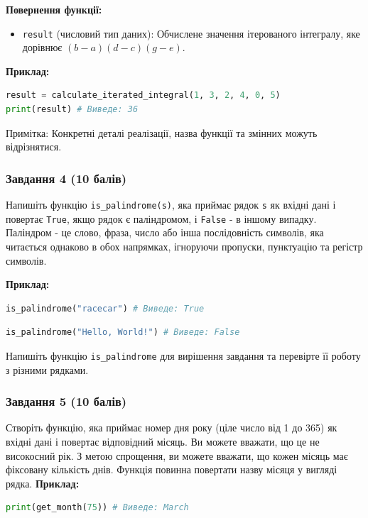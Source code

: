 \documentclass[12pt]{article}
\begin{document}
\textbf{Повернення функції:}
\begin{itemize}
\item \texttt{result} (числовий тип даних): Обчислене значення ітерованого інтегралу, яке дорівнює $(b - a)(d - c)(g - e)$.
\end{itemize}

\textbf{Приклад:}
\begin{lstlisting}[language=Python]
result = calculate_iterated_integral(1, 3, 2, 4, 0, 5)
print(result) # Виведе: 36
\end{lstlisting}

Примітка: Конкретні деталі реалізації, назва функції та змінних можуть відрізнятися.

\subsubsection{Завдання 4 (10 балів)}
Напишіть функцію \texttt{is\_palindrome(s)}, яка приймає рядок \texttt{s} як вхідні дані і повертає \texttt{True}, якщо рядок є паліндромом, і \texttt{False} - в іншому випадку. Паліндром - це слово, фраза, число або інша послідовність символів, яка читається однаково в обох напрямках, ігноруючи пропуски, пунктуацію та регістр символів.

\textbf{Приклад:}
\begin{lstlisting}[language=Python]
is_palindrome("racecar") # Виведе: True
\end{lstlisting}

\begin{lstlisting}[language=Python]
is_palindrome("Hello, World!") # Виведе: False
\end{lstlisting}

Напишіть функцію \texttt{is\_palindrome} для вирішення завдання та перевірте її роботу з різними рядками.

\subsubsection{Завдання 5 (10 балів)}
Створіть функцію, яка приймає номер дня року (ціле число від 1 до 365) як вхідні дані і повертає відповідний місяць. Ви можете вважати, що це не високосний рік. З метою спрощення, ви можете вважати, що кожен місяць має фіксовану кількість днів. Функція повинна повертати назву місяця у вигляді рядка.
\textbf{Приклад:}
\begin{lstlisting}[language=Python]
print(get_month(75)) # Виведе: March
\end{lstlisting}
\end{document}

